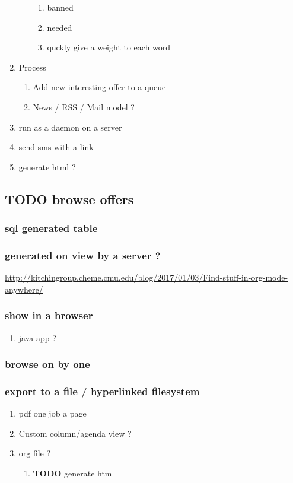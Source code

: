 \documentclass[11pt]{article}
\begin{document}
\begin{enumerate}
\begin{enumerate}
\begin{enumerate}
\item banned
\label{sec:org4f9563e}
\item needed
\label{sec:org58735bd}
\item quckly give a weight to each word
\label{sec:orgdbacae7}
\end{enumerate}
\end{enumerate}
\item Process
\label{sec:org7ac90bd}
\begin{enumerate}
\item Add new interesting offer to a queue
\label{sec:orgb42b8af}
\item News / RSS / Mail model ?
\label{sec:org9abd098}
\end{enumerate}
\item run as a daemon on a server
\label{sec:orgeb3fd74}
\item send sms with a link
\label{sec:org2f7122e}
\item generate html ?
\label{sec:orgac679b1}
\end{enumerate}
\subsection{{\bfseries\sffamily TODO} browse offers}
\label{sec:orgf385ce2}
\subsubsection{sql generated table}
\label{sec:org98bfa7a}
\subsubsection{generated on view by a server ?}
\label{sec:orge9495a7}
\url{http://kitchingroup.cheme.cmu.edu/blog/2017/01/03/Find-stuff-in-org-mode-anywhere/}
\subsubsection{show in a browser}
\label{sec:org4793025}
\begin{enumerate}
\item java app ?
\label{sec:org781c498}
\end{enumerate}
\subsubsection{browse on by one}
\label{sec:orgbaf9610}
\subsubsection{export to a file / hyperlinked filesystem}
\label{sec:org4820fa4}
\begin{enumerate}
\item pdf one job a page
\label{sec:org4ab8afd}
\item Custom column/agenda view ?
\label{sec:org83e6f1e}
\item org file ?
\label{sec:org4fbc2ae}
\begin{enumerate}
\item {\bfseries\sffamily TODO} generate html
\label{sec:org70a9380}
\end{enumerate}
\end{enumerate}
\end{document}
